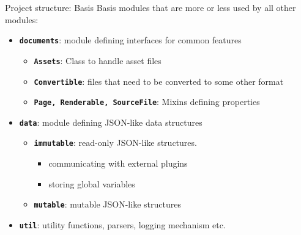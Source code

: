 \documentclass[compress, aspectratio=169]{beamer}
\renewcommand{\imp}[1]{\texttt{\textbf{#1}}}
\begin{document}
\begin{frame}[fragile]{Project structure: Basis}
    Basis modules that are more or less used by all other modules:
    \begin{itemize}
        \item \imp{documents}: module defining interfaces for common features 
            \begin{itemize}
                \item \imp{Assets}: Class to handle asset files
                \item \imp{Convertible}: files that need to be converted to some
                    other format
                \item \imp{Page, Renderable, SourceFile}: Mixins defining properties
            \end{itemize}
            \pause
        \item \imp{data}: module defining JSON-like data structures
            \begin{itemize}
                \item \imp{immutable}: read-only JSON-like structures. 
                    \begin{itemize}
                        \item communicating with external plugins 
                        \item storing global variables
                    \end{itemize}
                \item \imp{mutable}: mutable JSON-like structures
            \end{itemize}
            \pause
        \item \imp{util}: utility functions, parsers, logging mechanism etc.
    \end{itemize}
\end{frame}
\end{document}
